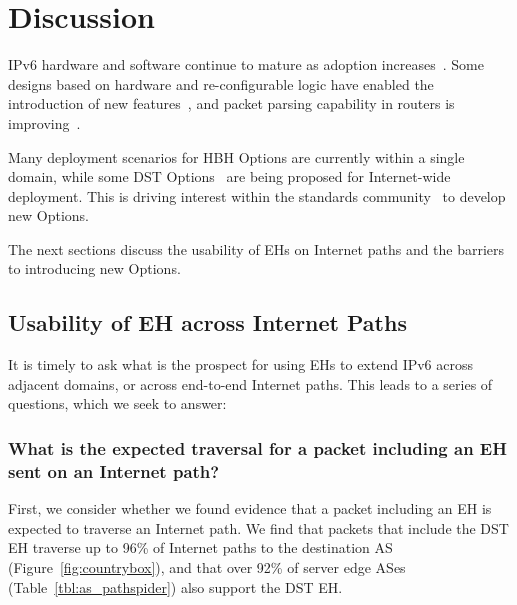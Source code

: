 \documentclass[conference]{IEEEtran}
\begin{document}

\section{Discussion} 
\label{sec:discussion}

IPv6 hardware and software continue to mature as adoption increases~\cite{v6adoption_ton}.
Some designs based on hardware and re-configurable logic have enabled the introduction of new features~\cite{cisco-silicon-one}, and packet parsing capability in routers is improving~\cite{metamorphosis, hauser2023}.

Many deployment scenarios for HBH Options are currently within a single domain, while some DST Options~\cite{ietf-ippm-ioam-ipv6-options-12} are being proposed for Internet-wide deployment.
This is driving interest within the standards community~\cite{ietf-6man-HBH-processing-06, ietf-v6ops-hbh-03, ietf-6man-eh-limits-04} to develop new Options.

The next sections discuss the usability of EHs on Internet paths and the barriers to introducing new Options.


\subsection{Usability of EH across Internet Paths}
  


It is timely to ask what is the prospect for using EHs to extend IPv6 across adjacent domains, or across end-to-end Internet paths. This leads to a series of questions, which we seek to answer: 
\subsubsection{What is the expected traversal for a packet including an EH sent on an Internet path?}
First, we consider whether we found evidence that a packet including an EH is expected to traverse an Internet path.
We find that packets that include the DST EH traverse up to 96\% of Internet paths to the destination AS (Figure~\ref{fig:countrybox}), and that over 92\% of server edge ASes (Table~\ref{tbl:as_pathspider}) also support the DST EH. 
\end{document}

